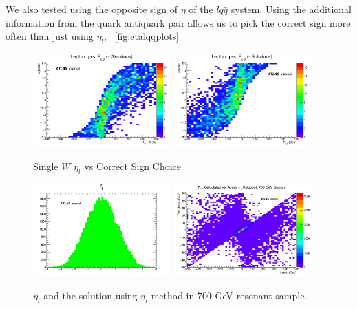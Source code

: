 We also tested using the opposite sign of $\eta$ of the $l q \bar{q}$ system. Using the additional information from the quark antiquark pair allows us to pick the correct sign more often than just using $\eta_{l}$, ~\ref{fig:etalqqplots}
\begin{figure}
		\includegraphics[width=0.47\textwidth]{figures/nupz/wminus.png}
		\includegraphics[width=0.47\textwidth]{figures/nupz/wplus.png}
		\caption{Single $W$ $\eta_{l}$ vs Correct Sign Choice}
		\label{fig:etaplots}
\end{figure}

\begin{figure}[!h]
\begin{center}
\includegraphics*[width=0.47\textwidth] {figures/nupz/etaldist.png}
\includegraphics*[width=0.47\textwidth] {figures/nupz/eta-l700.png}
	\caption{$\eta_{l}$ and the solution using $\eta_{l}$ method in 700 GeV resonant sample.}
\label{fig:wdist}
\end{center}
\end{figure}

